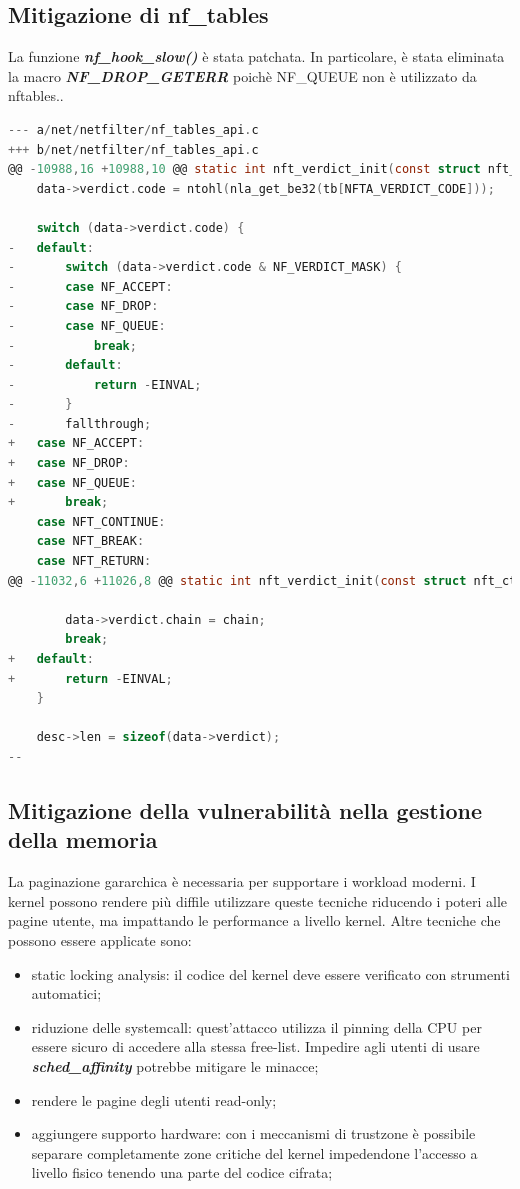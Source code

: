 \documentclass{article}
\begin{document}
\subsection{Mitigazione di nf\_tables}
La funzione \textbf{\textit{nf\_hook\_slow()}} è stata patchata. In particolare, è stata 
eliminata la macro \textbf{\textit{NF\_DROP\_GETERR}} poichè NF\_QUEUE non è utilizzato da 
nftables.\cite{Patch}.

\begin{lstlisting}[language=C,style=CStyle,caption="Commit applicato per mitigare la vulnerabilità"]
--- a/net/netfilter/nf_tables_api.c
+++ b/net/netfilter/nf_tables_api.c
@@ -10988,16 +10988,10 @@ static int nft_verdict_init(const struct nft_ctx *ctx, struct nft_data *data,
 	data->verdict.code = ntohl(nla_get_be32(tb[NFTA_VERDICT_CODE]));
 
 	switch (data->verdict.code) {
-	default:
-		switch (data->verdict.code & NF_VERDICT_MASK) {
-		case NF_ACCEPT:
-		case NF_DROP:
-		case NF_QUEUE:
-			break;
-		default:
-			return -EINVAL;
-		}
-		fallthrough;
+	case NF_ACCEPT:
+	case NF_DROP:
+	case NF_QUEUE:
+		break;
 	case NFT_CONTINUE:
 	case NFT_BREAK:
 	case NFT_RETURN:
@@ -11032,6 +11026,8 @@ static int nft_verdict_init(const struct nft_ctx *ctx, struct nft_data *data,
 
 		data->verdict.chain = chain;
 		break;
+	default:
+		return -EINVAL;
 	}
 
 	desc->len = sizeof(data->verdict);
--  
\end{lstlisting}

\subsection{Mitigazione della vulnerabilità nella gestione della memoria}
La paginazione gararchica è necessaria per supportare i workload moderni. I kernel possono 
rendere più diffile utilizzare queste tecniche riducendo i poteri alle pagine utente, 
ma impattando le performance a livello kernel. Altre tecniche che possono essere applicate sono:
\begin{itemize}
  \item static locking analysis: il codice del kernel deve essere verificato con strumenti 
    automatici;
  \item riduzione delle systemcall: quest'attacco utilizza il pinning della CPU per essere 
    sicuro di accedere alla stessa free-list. Impedire agli utenti di usare 
    \textbf{\textit{sched\_affinity}} potrebbe mitigare le minacce;
  \item rendere le pagine degli utenti read-only;
  \item aggiungere supporto hardware: con i meccanismi di trustzone è possibile separare 
    completamente zone critiche del kernel impedendone l'accesso a livello fisico tenendo una 
    parte del codice cifrata;
\end{itemize}
\clearpage

\nocite{*}


\end{document}
